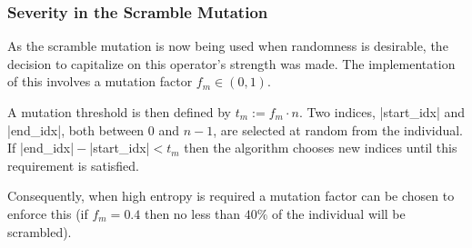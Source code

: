 \subsubsection{Severity in the Scramble Mutation}\label{sssec:severity}
As the scramble mutation is now being used when randomness is desirable, the 
decision to capitalize on this operator's strength was made. The implementation
of this involves a mutation factor $f_m \in (0, 1)$. 

{\small}
\noindent A mutation threshold is then defined by ${t_m := f_m \cdot n}$. 
Two indices, |start_idx| and |end_idx|, both between $0$ and $n-1$, are 
selected at random from the individual. If |end_idx|${}-{}$|start_idx|${}< t_m$
then the algorithm chooses new indices until this requirement is satisfied.

Consequently, when high entropy is required a mutation factor can be chosen 
to enforce this (\eg if $f_m = 0.4$ then no less than $40\%$ of the individual
will be scrambled).
